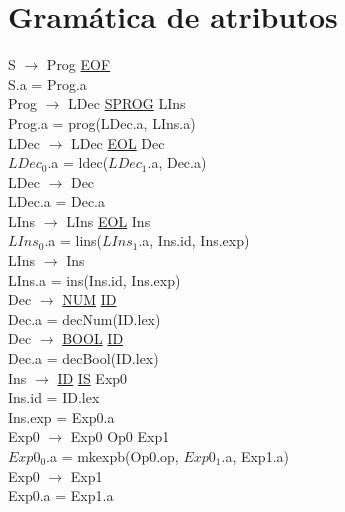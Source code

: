 \documentclass[\main/MemoriaPL.tex]{subfiles}
\begin{document}
  \section{Gramática de atributos}
    S $\rightarrow$ Prog \underline{EOF}\\
    \hspace{5mm}S.a = Prog.a\\
    Prog $\rightarrow$ LDec \underline{SPROG} LIns\\
    \hspace{5mm}Prog.a = prog(LDec.a, LIns.a)\\
    LDec $\rightarrow$ LDec \underline{EOL} Dec\\
    \hspace{5mm}$LDec_0$.a = ldec($LDec_1$.a, Dec.a)\\
    LDec $\rightarrow$ Dec\\
    \hspace{5mm}LDec.a = Dec.a\\
    LIns $\rightarrow$ LIns \underline{EOL} Ins\\
    \hspace{5mm}$LIns_0$.a = lins($LIns_1$.a, Ins.id, Ins.exp)\\
    LIns $\rightarrow$ Ins\\
    \hspace{5mm}LIns.a = ins(Ins.id, Ins.exp)\\
    Dec $\rightarrow$ \underline{NUM} \underline{ID}\\
    \hspace{5mm}Dec.a = decNum(ID.lex)\\
    Dec $\rightarrow$ \underline{BOOL} \underline{ID}\\
    \hspace{5mm}Dec.a = decBool(ID.lex)\\
    Ins $\rightarrow$ \underline{ID} \underline{IS} Exp0\\
    \hspace{5mm}Ins.id = ID.lex\\
    \hspace{5mm}Ins.exp = Exp0.a\\
    Exp0 $\rightarrow$ Exp0 Op0 Exp1\\
    \hspace*{5mm}$Exp0_0$.a = mkexpb(Op0.op, $Exp0_1$.a, Exp1.a)\\
    Exp0 $\rightarrow$ Exp1\\
    \hspace*{5mm}Exp0.a = Exp1.a\\
\end{document}
